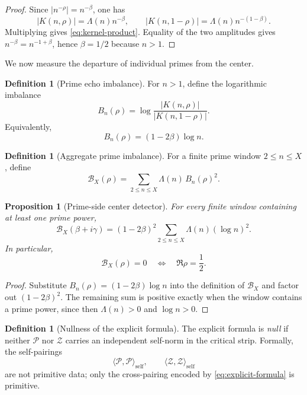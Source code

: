 \documentclass[11pt,a4paper]{article}
\theoremstyle{plain}
\newtheorem{proposition}[theorem]{Proposition}
\theoremstyle{definition}
\newtheorem{definition}[theorem]{Definition}
\theoremstyle{remark}
\numberwithin{equation}{section}
\newcommand{\PF}{\mathcal{P}}
\newcommand{\ZF}{\mathcal{Z}}
\begin{document}
\begin{proof}
Since \(|n^{-\rho}|=n^{-\beta}\), one has
\[
  |K(n,\rho)|=\Lambda(n)n^{-\beta},
  \qquad
  |K(n,1-\rho)|=\Lambda(n)n^{-(1-\beta)}.
\]
Multiplying gives \eqref{eq:kernel-product}.  Equality of the two
amplitudes gives \(n^{-\beta}=n^{-1+\beta}\), hence
\(\beta=1/2\) because \(n>1\).
\end{proof}

\medskip\noindent We now measure the departure of individual primes from the center.

\begin{definition}[Prime echo imbalance]
\label{def:prime-echo-imbalance}
For \(n>1\), define the logarithmic imbalance
\[
  B_n(\rho)
  =
  \log\frac{|K(n,\rho)|}{|K(n,1-\rho)|}.
\]
Equivalently,
\[
  B_n(\rho)=(1-2\beta)\log n.
\]
\end{definition}

\begin{definition}[Aggregate prime imbalance]
\label{def:aggregate-prime-imbalance}
For a finite prime window \(2\le n\le X\), define
\[
  \mathcal B_X(\rho)
  =
  \sum_{2\le n\le X}\Lambda(n)\,B_n(\rho)^2.
\]
\end{definition}

\begin{proposition}[Prime-side center detector]
\label{prop:prime-side-center}
For every finite window containing at least one prime power,
\[
  \mathcal B_X(\beta+i\gamma)
  =
  (1-2\beta)^2
  \sum_{2\le n\le X}\Lambda(n)(\log n)^2.
\]
In particular,
\[
  \mathcal B_X(\rho)=0
  \quad\Longleftrightarrow\quad
  \Re\rho=\frac12.
\]
\end{proposition}

\begin{proof}
Substitute \(B_n(\rho)=(1-2\beta)\log n\) into the definition of
\(\mathcal B_X\) and factor out \((1-2\beta)^2\).  The remaining sum is
positive exactly when the window contains a prime power, since then
\(\Lambda(n)>0\) and \(\log n>0\).
\end{proof}

\begin{definition}[Nullness of the explicit formula]
The explicit formula is \emph{null} if neither \(\PF\) nor \(\ZF\)
carries an independent self-norm in the critical strip.  Formally, the
self-pairings
\[
  \langle \PF,\PF\rangle_{\mathrm{self}},\qquad
  \langle \ZF,\ZF\rangle_{\mathrm{self}}
\]
are not primitive data; only the cross-pairing encoded by
\eqref{eq:explicit-formula} is primitive.
\end{definition}
\end{document}
